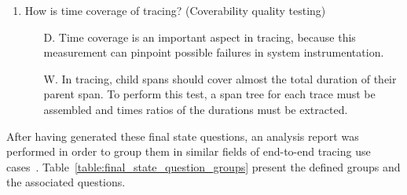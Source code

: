 \begin{enumerate}
    \item How is time coverage of tracing? (Coverability quality testing)
          \begin{itemize}
              \item[D.] Time coverage is an important aspect in tracing, because this measurement can pinpoint possible failures in system instrumentation.
              \item[W.] In tracing, child spans should cover almost the total duration of their parent span. To perform this test, a span tree for each trace must be assembled and times ratios of the durations must be extracted.
          \end{itemize}
\end{enumerate}


After having generated these final state questions, an analysis report was performed in order to group them in similar fields of end-to-end tracing use cases~\cite{Sambasivan2014}. Table~\ref{table:final_state_question_groups} present the defined groups and the associated questions.

